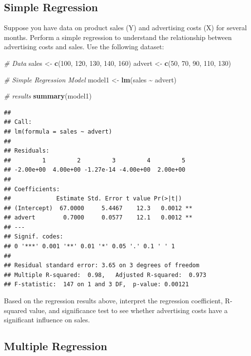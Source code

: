 \documentclass[
]{book}
\newenvironment{Shaded}{\begin{snugshade}}{\end{snugshade}}
\newcommand{\CommentTok}[1]{\textcolor[rgb]{0.56,0.35,0.01}{\textit{#1}}}
\newcommand{\DecValTok}[1]{\textcolor[rgb]{0.00,0.00,0.81}{#1}}
\newcommand{\FunctionTok}[1]{\textcolor[rgb]{0.13,0.29,0.53}{\textbf{#1}}}
\newcommand{\NormalTok}[1]{#1}
\newcommand{\OtherTok}[1]{\textcolor[rgb]{0.56,0.35,0.01}{#1}}
\newcommand{\SpecialCharTok}[1]{\textcolor[rgb]{0.81,0.36,0.00}{\textbf{#1}}}
\begin{document}
\hypertarget{simple-regression}{%
\subsection{Simple Regression}\label{simple-regression}}

Suppose you have data on product sales (Y) and advertising costs (X) for several months. Perform a simple regression to understand the relationship between advertising costs and sales. Use the following dataset:

\begin{Shaded}
\begin{Highlighting}[]
\CommentTok{\# Data}
\NormalTok{sales }\OtherTok{\textless{}{-}} \FunctionTok{c}\NormalTok{(}\DecValTok{100}\NormalTok{, }\DecValTok{120}\NormalTok{, }\DecValTok{130}\NormalTok{, }\DecValTok{140}\NormalTok{, }\DecValTok{160}\NormalTok{)}
\NormalTok{advert }\OtherTok{\textless{}{-}} \FunctionTok{c}\NormalTok{(}\DecValTok{50}\NormalTok{, }\DecValTok{70}\NormalTok{, }\DecValTok{90}\NormalTok{, }\DecValTok{110}\NormalTok{, }\DecValTok{130}\NormalTok{)}

\CommentTok{\# Simple Regression Model}
\NormalTok{model1 }\OtherTok{\textless{}{-}} \FunctionTok{lm}\NormalTok{(sales }\SpecialCharTok{\textasciitilde{}}\NormalTok{ advert)}

\CommentTok{\# results}
\FunctionTok{summary}\NormalTok{(model1)}
\end{Highlighting}
\end{Shaded}

\begin{verbatim}
## 
## Call:
## lm(formula = sales ~ advert)
## 
## Residuals:
##         1         2         3         4         5 
## -2.00e+00  4.00e+00 -1.27e-14 -4.00e+00  2.00e+00 
## 
## Coefficients:
##             Estimate Std. Error t value Pr(>|t|)   
## (Intercept)  67.0000     5.4467    12.3   0.0012 **
## advert        0.7000     0.0577    12.1   0.0012 **
## ---
## Signif. codes:  
## 0 '***' 0.001 '**' 0.01 '*' 0.05 '.' 0.1 ' ' 1
## 
## Residual standard error: 3.65 on 3 degrees of freedom
## Multiple R-squared:  0.98,   Adjusted R-squared:  0.973 
## F-statistic:  147 on 1 and 3 DF,  p-value: 0.00121
\end{verbatim}

Based on the regression results above, interpret the regression coefficient, R-squared value, and significance test to see whether advertising costs have a significant influence on sales.

\hypertarget{multiple-regression}{%
\subsection{Multiple Regression}\label{multiple-regression}}
\end{document}
